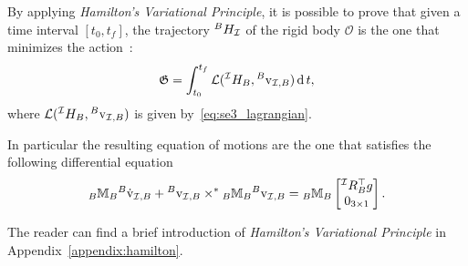 By applying \emph{Hamilton's Variational Principle}, it is possible to prove that given a time interval $[t_0,t_f]$, the trajectory ${}^B H _ {\mathcal{I}}$ of the rigid body $\mathcal{O}$ is the one that minimizes the action~\citep[Theorem~2.1]{Traversaro2017ModellingDynamics}:
\begin{equation}
       \mathfrak{G} = \int_{t_0}^{t_f} \mathcal{L}({}^{\mathcal{I}} H _ B, {}^B \mathrm{v}_{\mathcal{I} ,B})\operatorname{d} t,
\end{equation}
where $\mathcal{L}({}^{\mathcal{I}} H _ B, {}^B \mathrm{v}_{\mathcal{I} ,B})$ is given by~\eqref{eq:se3_lagrangian}.
\par
In particular the resulting equation of motions are the one that satisfies the following differential equation
\begin{equation}
\label{eq:eurel-poincare-equations-lie-se3}
     {}_B \mathbb{M} _ B {}^B \dot{\mathrm{v}} _{\mathcal{I}, B } + {}^B \mathrm{v} _{\mathcal{I}, B } \times^* {}_B \mathbb{M} _ B {}^B \mathrm{v} _{\mathcal{I}, B }  = {}_B \mathbb{M} _ B \begin{bmatrix}
      {}^{\mathcal{I}} R _ B ^\top g \\ 
      0_{3\times1}
     \end{bmatrix}.
\end{equation}
\par
The reader can find a brief introduction of \emph{Hamilton's Variational Principle} in Appendix~\ref{appendix:hamilton}.



